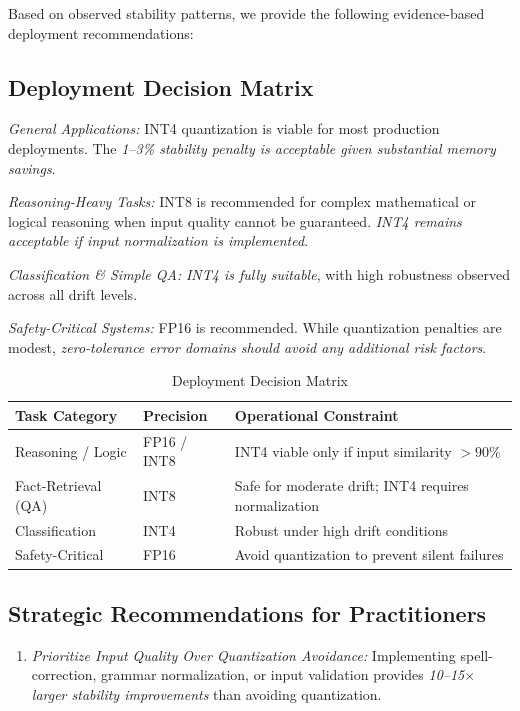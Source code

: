 \documentclass[conference]{IEEEtran}
\begin{document}
{Based on observed stability patterns, we provide the following evidence-based deployment recommendations:

\subsection{Deployment Decision Matrix}

\textit{General Applications:} INT4 quantization is viable for most production deployments. The \textit{1--3\% stability penalty is acceptable given substantial memory savings}.

\textit{Reasoning-Heavy Tasks:} INT8 is recommended for complex mathematical or logical reasoning when input quality cannot be guaranteed. \textit{INT4 remains acceptable if input normalization is implemented}.

\textit{Classification \& Simple QA:} \textit{INT4 is fully suitable}, with high robustness observed across all drift levels.

\textit{Safety-Critical Systems:} FP16 is recommended. While quantization penalties are modest, \textit{zero-tolerance error domains should avoid any additional risk factors}.

\begin{table}[t]
\centering
\caption{Deployment Decision Matrix}
\begin{tabular}{|p{2.2cm}|p{2.2cm}|p{3.5cm}|}
\hline
\textbf{Task Category} & \textbf{Precision} & \textbf{Operational Constraint} \\
\hline
Reasoning / Logic & FP16 / INT8 & INT4 viable only if input similarity $> 90\%$ \\
\hline
Fact-Retrieval (QA) & INT8 & Safe for moderate drift; INT4 requires normalization \\
\hline
Classification & INT4 & Robust under high drift conditions \\
\hline
Safety-Critical & FP16 & Avoid quantization to prevent silent failures \\
\hline
\end{tabular}
\end{table}

\subsection{Strategic Recommendations for Practitioners}

\begin{enumerate}
\item \textit{Prioritize Input Quality Over Quantization Avoidance:} Implementing spell-correction, grammar normalization, or input validation provides \textit{10--15$\times$ larger stability improvements} than avoiding quantization.


\end{enumerate}}
\end{document}
